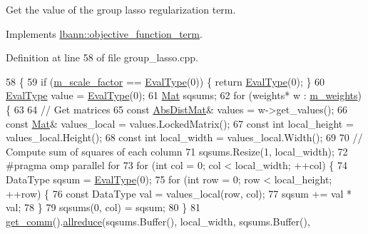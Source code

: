 Get the value of the group lasso regularization term. 

Implements \hyperlink{classlbann_1_1objective__function__term_a7a82f2cdbc954655ac860896306aed0c}{lbann\+::objective\+\_\+function\+\_\+term}.



Definition at line 58 of file group\+\_\+lasso.\+cpp.


\begin{DoxyCode}
58                                                               \{
59   \textcolor{keywordflow}{if} (\hyperlink{classlbann_1_1objective__function__term_a59a544b8ff0455ed5091de3bf0d81c3c}{m\_scale\_factor} == \hyperlink{base_8hpp_a3266f5ac18504bbadea983c109566867}{EvalType}(0)) \{ \textcolor{keywordflow}{return} \hyperlink{base_8hpp_a3266f5ac18504bbadea983c109566867}{EvalType}(0); \}
60   \hyperlink{base_8hpp_a3266f5ac18504bbadea983c109566867}{EvalType} value = \hyperlink{base_8hpp_a3266f5ac18504bbadea983c109566867}{EvalType}(0);
61   \hyperlink{base_8hpp_a68f11fdc31b62516cb310831bbe54d73}{Mat} sqsums;
62   \textcolor{keywordflow}{for} (weights* w : \hyperlink{classlbann_1_1objective__function__term_a1d601c29153ae9cb54c585887608f2bf}{m\_weights}) \{
63 
64     \textcolor{comment}{// Get matrices}
65     \textcolor{keyword}{const} \hyperlink{base_8hpp_a9a697a504ae84010e7439ffec862b470}{AbsDistMat}& values = w->get\_values();
66     \textcolor{keyword}{const} \hyperlink{base_8hpp_a68f11fdc31b62516cb310831bbe54d73}{Mat}& values\_local = values.LockedMatrix();
67     \textcolor{keyword}{const} \textcolor{keywordtype}{int} local\_height = values\_local.Height();
68     \textcolor{keyword}{const} \textcolor{keywordtype}{int} local\_width = values\_local.Width();
69 
70     \textcolor{comment}{// Compute sum of squares of each column}
71     sqsums.Resize(1, local\_width);
72 \textcolor{preprocessor}{    #pragma omp parallel for}
73     \textcolor{keywordflow}{for} (\textcolor{keywordtype}{int} col = 0; col < local\_width; ++col) \{
74       DataType sqsum = \hyperlink{base_8hpp_a3266f5ac18504bbadea983c109566867}{EvalType}(0);
75       \textcolor{keywordflow}{for} (\textcolor{keywordtype}{int} row = 0; row < local\_height; ++row) \{
76         \textcolor{keyword}{const} DataType val = values\_local(row, col);
77         sqsum += val * val;
78       \}
79       sqsums(0, col) = sqsum;
80     \}
81     \hyperlink{classlbann_1_1objective__function__term_a5f89b676a26a6b76ddc26563ac87beb9}{get\_comm}().\hyperlink{classlbann_1_1lbann__comm_af5631e5f0f54e4df4958eba9df2599ef}{allreduce}(sqsums.Buffer(), local\_width, sqsums.Buffer(),

\end{DoxyCode}
